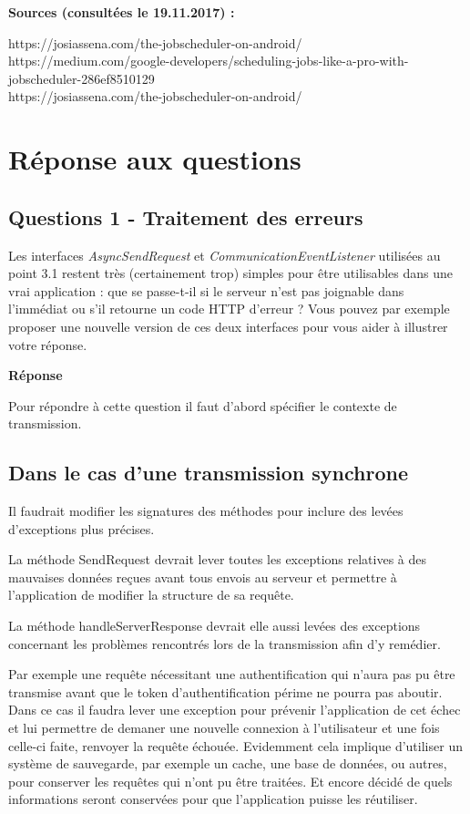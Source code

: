 \documentclass[francais,12pt]{article}
\begin{document}
	\textbf{Sources (consultées le 19.11.2017) :}
	
	https://josiassena.com/the-jobscheduler-on-android/ \\
	https://medium.com/google-developers/scheduling-jobs-like-a-pro-with-jobscheduler-286ef8510129 \\
	https://josiassena.com/the-jobscheduler-on-android/ \\
	
	
	\section*{Réponse aux questions}
	
	\subsection*{Questions 1 - Traitement des erreurs}
	
	Les interfaces \textit{AsyncSendRequest} et \textit{CommunicationEventListener} utilisées au point 3.1 restent très (certainement trop) simples pour être utilisables dans une vrai application : que se passe-t-il si le serveur n'est pas joignable dans l'immédiat ou s'il retourne un code HTTP d'erreur ? Vous pouvez par exemple proposer une nouvelle version de ces deux interfaces pour vous aider à illustrer votre réponse.
	
	{\color[rgb]{0,0.5,0.23}\textbf{Réponse}}
	
	Pour répondre à cette question il faut d’abord spécifier le contexte de transmission.
	
	\subsection{Dans le cas d’une transmission synchrone}
	Il faudrait modifier les signatures des méthodes pour inclure des levées d’exceptions plus précises. 
	
	La méthode SendRequest devrait lever toutes les exceptions relatives à des mauvaises données reçues avant tous envois au serveur et permettre à l’application de modifier la structure de sa requête.
	
	La méthode handleServerResponse devrait elle aussi levées des exceptions concernant les problèmes rencontrés lors de la transmission afin d’y remédier.
	
	Par exemple une requête nécessitant une authentification qui n’aura pas pu être transmise avant que le token d’authentification périme ne pourra pas aboutir. Dans ce cas il faudra lever une exception pour prévenir l’application de cet échec et lui permettre de demaner une nouvelle connexion à l’utilisateur et une fois celle-ci faite, renvoyer la requête échouée.
	Evidemment cela implique d’utiliser un système de sauvegarde, par exemple un cache, une base de données, ou autres, pour conserver les requêtes qui n’ont pu être traitées.  Et encore décidé de quels informations seront conservées pour que l’application puisse les réutiliser.
	
\end{document}
